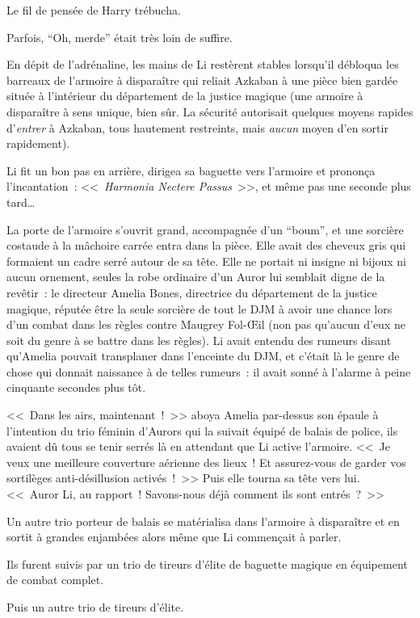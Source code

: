 Le fil de pensée de Harry trébucha.

Parfois, “Oh, merde” était très loin de suffire.

\later

En dépit de l'adrénaline, les mains de Li restèrent stables lorsqu'il débloqua les barreaux de l'armoire à disparaître qui reliait Azkaban à une pièce bien gardée située à l'intérieur du département de la justice magique (une armoire à disparaître à sens unique, bien sûr. La sécurité autorisait quelques moyens rapides d'\emph{entrer} à Azkaban, tous hautement restreints, mais \emph{aucun} moyen d'en sortir rapidement).

Li fit un bon pas en arrière, dirigea sa baguette vers l'armoire et prononça l'incantation~: <<~\emph{Harmonia Nectere Passus}~>>, et même pas une seconde plus tard…

La porte de l'armoire s'ouvrit grand, accompagnée d'un “boum”, et une sorcière costaude à la mâchoire carrée entra dans la pièce. Elle avait des cheveux gris qui formaient un cadre serré autour de sa tête. Elle ne portait ni insigne ni bijoux ni aucun ornement, seules la robe ordinaire d'un Auror lui semblait digne de la revêtir~: le directeur Amelia Bones, directrice du département de la justice magique, réputée être la seule sorcière de tout le DJM à avoir une chance lors d'un combat dans les règles contre Maugrey Fol-Œil (non pas qu'aucun d'eux ne soit du genre à se battre dans les règles). Li avait entendu des rumeurs disant qu'Amelia pouvait transplaner dans l'enceinte du DJM, et c'était là le genre de chose qui donnait naissance à de telles rumeurs~: il avait sonné à l'alarme à peine cinquante secondes plus tôt.

<<~Dans les airs, maintenant~!~>> aboya Amelia par-dessus son épaule à l'intention du trio féminin d'Aurors qui la suivait équipé de balais de police, ils avaient dû tous se tenir serrés là en attendant que Li active l'armoire. <<~Je veux une meilleure couverture aérienne des lieux~! Et assurez-vous de garder vos sortilèges anti-désillusion activés~!~>> Puis elle tourna sa tête vers lui. <<~Auror Li, au rapport~! Savons-nous déjà comment ils sont entrés~?~>>

Un autre trio porteur de balais se matérialisa dans l'armoire à disparaître et en sortit à grandes enjambées alors même que Li commençait à parler.

Ils furent suivis par un trio de tireurs d'élite de baguette magique en équipement de combat complet.

Puis un autre trio de tireurs d'élite.

